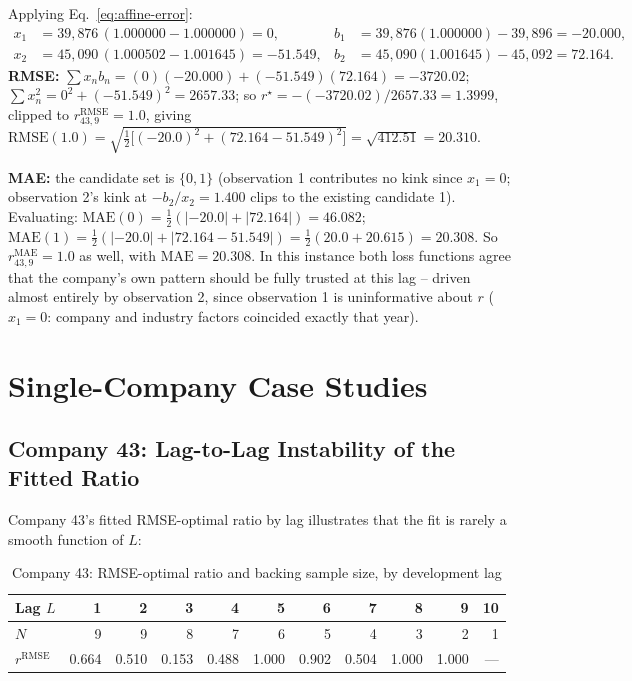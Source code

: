 \documentclass[11pt]{article}
\newcommand{\rmae}{r^{\text{MAE}}}
\newcommand{\rrmse}{r^{\text{RMSE}}}
\begin{document}
Applying Eq.~\eqref{eq:affine-error}:
\begin{align*}
x_1 &= 39{,}876\,(1.000000 - 1.000000) = 0, &
b_1 &= 39{,}876(1.000000) - 39{,}896 = -20.000,\\
x_2 &= 45{,}090\,(1.000502 - 1.001645) = -51.549, &
b_2 &= 45{,}090(1.001645) - 45{,}092 = 72.164.
\end{align*}
\textbf{RMSE:} $\sum x_n b_n = (0)(-20.000)+(-51.549)(72.164) = -3720.02$;
$\sum x_n^2 = 0^2 + (-51.549)^2 = 2657.33$; so
$r^\star = -(-3720.02)/2657.33 = 1.3999$, clipped to $\rrmse_{43,9}=1.0$, giving
$\text{RMSE}(1.0) = \sqrt{\tfrac{1}{2}\bigl[(-20.0)^2 + (72.164-51.549)^2\bigr]} = \sqrt{412.51} = 20.310$.

\textbf{MAE:} the candidate set is $\{0,1\}$ (observation 1 contributes no kink since $x_1=0$;
observation 2's kink at $-b_2/x_2 = 1.400$ clips to the existing candidate 1). Evaluating:
$\text{MAE}(0) = \tfrac12(|{-20.0}|+|72.164|) = 46.082$;
$\text{MAE}(1) = \tfrac12(|{-20.0}|+|72.164-51.549|) = \tfrac12(20.0+20.615)=20.308$.
So $\rmae_{43,9} = 1.0$ as well, with $\text{MAE}=20.308$. In this instance both loss functions
agree that the company's own pattern should be fully trusted at this lag -- driven almost entirely
by observation 2, since observation 1 is uninformative about $r$ ($x_1=0$: company and industry
factors coincided exactly that year).

\section{Single-Company Case Studies}
\label{sec:casestudies}

\subsection{Company 43: Lag-to-Lag Instability of the Fitted Ratio}

Company 43's fitted RMSE-optimal ratio by lag illustrates that the fit is rarely a smooth function
of $L$:

\begin{table}[h]
\centering
\caption{Company 43: RMSE-optimal ratio and backing sample size, by development lag}
\begin{tabular}{lrrrrrrrrrr}
\toprule
Lag $L$ & 1 & 2 & 3 & 4 & 5 & 6 & 7 & 8 & 9 & 10 \\
\midrule
$N$ & 9 & 9 & 8 & 7 & 6 & 5 & 4 & 3 & 2 & 1 \\
$\rrmse$ & 0.664 & 0.510 & 0.153 & 0.488 & 1.000 & 0.902 & 0.504 & 1.000 & 1.000 & --- \\
\bottomrule
\end{tabular}
\end{table}
\end{document}
